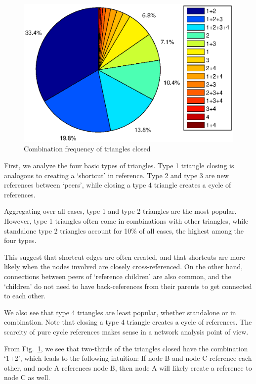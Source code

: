 \documentclass[10pt,twocolumn]{article}
\begin{document}
\begin{figure}[t]
    \centering
    \includegraphics[scale=0.45, trim = 6cm 1cm 0cm 0cm,clip=true]{./graphs/15_tri.eps}
    \caption{Combination frequency of triangles closed} \label{fig:combo15}
\end{figure}

First, we analyze the four basic types of triangles. Type 1 triangle closing is analogous to creating a `shortcut' in reference. Type 2 and type 3 are new references between `peers', while closing a type 4 triangle creates a cycle of references. 

Aggregating over all cases, type 1 and type 2 triangles are the most popular. However, type 1 triangles often come in combinations with other triangles, while standalone type 2 triangles account for 10\% of all cases, the highest among the four types.

This suggest that shortcut edges are often created, and that shortcuts are more likely when the nodes involved are closely cross-referenced. On the other hand, connections between peers of `reference children' are also common, and the `children' do not need to have back-references from their parents to get connected to each other.

We also see that type 4 triangles are least popular, whether standalone or in combination. Note that closing a type 4 triangle creates a cycle of references. The scarcity of pure cycle references makes sense in a network analysis point of view.

From Fig.~\ref{fig:combo15}, we see that two-thirds of the triangles closed have the combination `1+2', which leads to the following intuition: If node B and node C reference each other, and node A references node B, then node A will likely create a reference to node C as well.
\end{document}
